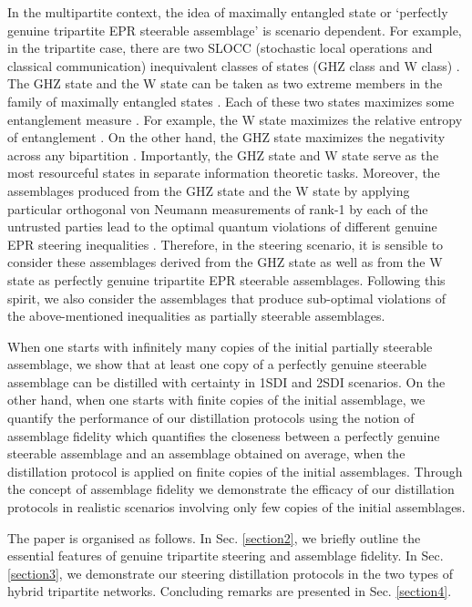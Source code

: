 \documentclass[reprint,superscriptaddress,nofootinbib,amsmath,amssymb,aps,pra,longbibliography]{revtex4-1}
\begin{document}
 In the multipartite context, the idea of maximally entangled state or `perfectly genuine tripartite EPR steerable assemblage’ is  scenario dependent. For example, in the tripartite case, there are two SLOCC (stochastic local operations and classical communication) inequivalent classes of states (GHZ class and W class) \cite{Dur2000}. The GHZ state and the W state can be taken as two extreme members in the family of maximally entangled states \cite{Tamaryan09}. Each of these two states maximizes some entanglement measure \cite{Tamaryan09} . For example, the W state maximizes the relative entropy of entanglement  \cite{Plenio2001}. On the other hand, the GHZ state maximizes the negativity  across any bipartition \cite{Karol1998}. Importantly, the GHZ state and W state  serve as the most resourceful states in separate information theoretic tasks. Moreover, the assemblages produced from the GHZ state and the W state by applying particular orthogonal von Neumann measurements of rank-1 by each of the untrusted parties lead to the optimal quantum violations of different genuine EPR steering inequalities \cite{Cavalcanti15}. Therefore, in the steering scenario, it is sensible to consider these assemblages derived from the GHZ state as well as from the W state as perfectly genuine tripartite EPR steerable assemblages. Following this spirit, we also consider the assemblages that produce
sub-optimal violations of the above-mentioned inequalities \cite{Cavalcanti15} as partially steerable assemblages.

When one starts with infinitely many copies of the initial partially steerable assemblage,  we show that at least one copy of a perfectly genuine steerable assemblage can be distilled with certainty in 1SDI  and 2SDI scenarios. On the other hand, when one starts with finite copies of the initial assemblage, we quantify the performance of our distillation protocols using the notion of assemblage fidelity which quantifies the closeness between a perfectly genuine steerable assemblage and an assemblage obtained on average, when the distillation protocol is applied on finite copies of the initial assemblages. Through the concept of assemblage fidelity we demonstrate the efficacy of our distillation protocols in realistic scenarios involving only few copies of the initial assemblages.


The paper is organised as follows. In Sec. \ref{section2}, we briefly outline the essential features of genuine tripartite steering and assemblage fidelity. In Sec. \ref{section3}, we demonstrate our steering distillation protocols in the two types of hybrid tripartite networks. Concluding remarks  are presented in Sec. \ref{section4}.
\end{document}
